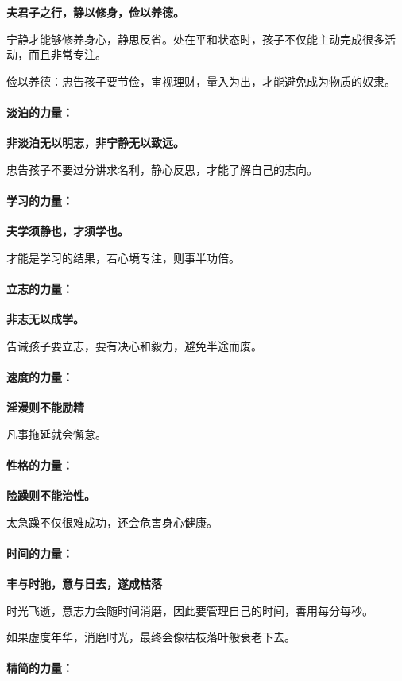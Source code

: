 \documentclass[UTF8,a4paper,8pt]{ctexbook}
\begin{document}
		\textbf{夫君子之行，静以修身，俭以养德。}
		
		宁静才能够修养身心，静思反省。处在平和状态时，孩子不仅能主动完成很多活动，而且非常专注。
		
		俭以养德：忠告孩子要节俭，审视理财，量入为出，才能避免成为物质的奴隶。
	\paragraph{淡泊的力量：}
	
		\textbf{非淡泊无以明志，非宁静无以致远。}
		
		忠告孩子不要过分讲求名利，静心反思，才能了解自己的志向。	
	\paragraph{学习的力量：}
	
		\textbf{夫学须静也，才须学也。}
		
		才能是学习的结果，若心境专注，则事半功倍。
	\paragraph{立志的力量：}
	
		\textbf{非志无以成学。}
		
		告诫孩子要立志，要有决心和毅力，避免半途而废。
	\paragraph{速度的力量：}
		
		\textbf{淫漫则不能励精}
		
		凡事拖延就会懈怠。
		
	\paragraph{性格的力量：}
	
		\textbf{险躁则不能治性。}
		
		太急躁不仅很难成功，还会危害身心健康。
	
	\paragraph{时间的力量：}
	
		\textbf{丰与时驰，意与日去，遂成枯落}
		
		时光飞逝，意志力会随时间消磨，因此要管理自己的时间，善用每分每秒。
		
		如果虚度年华，消磨时光，最终会像枯枝落叶般衰老下去。
	\paragraph{精简的力量：}
		
\end{document}

